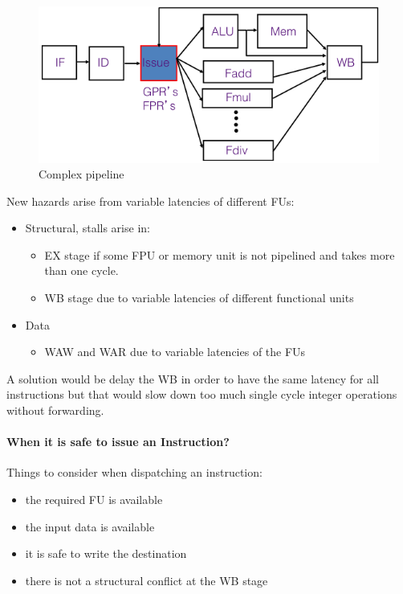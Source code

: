 \begin{figure}[h]
    \centering
    \includegraphics[scale = 0.4]{images/complex-pipeline}
    \caption{Complex pipeline}
    \label{fig:complex-pipeline}
\end{figure}

New hazards arise from variable latencies of different FUs:
\begin{itemize}
    \item Structural, stalls arise in:
    \begin{itemize}
        \item EX stage if some FPU or memory unit is not pipelined and takes more than one cycle.
        \item WB stage due to variable latencies of different functional units
    \end{itemize}
    \item Data
    \begin{itemize}
        \item WAW and WAR due to variable latencies of the FUs
    \end{itemize}
\end{itemize}

A solution would be delay the WB in order to have the same latency for all instructions but that would slow down too
much single cycle integer operations without forwarding.

\paragraph{When it is safe to issue an Instruction?} Things to consider when dispatching an instruction:
\begin{itemize}
    \item the required FU is available
    \item the input data is available
    \item it is safe to write the destination
    \item there is not a structural conflict at the WB stage
\end{itemize}

